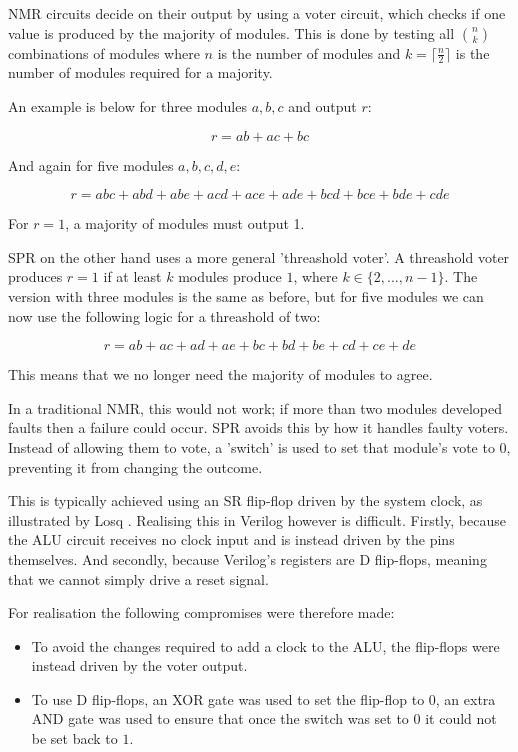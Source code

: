 \documentclass[a4paper,12pt]{article}
\begin{document}
    NMR circuits decide on their output by using a voter circuit, which checks if one value is produced by the majority of modules. This is done by testing all ${n \choose k}$ combinations of modules where $n$ is the number of modules and $k = \lceil\frac{n}{2}\rceil$ is the number of modules required for a majority.

    An example is below for three modules $a, b, c$ and output $r$:

    $$r = ab + ac + bc$$

    And again for five modules $a, b, c, d, e$:

    $$r = abc + abd + abe + acd + ace + ade + bcd + bce + bde + cde$$

    For $r = 1$, a majority of modules must output 1.

    SPR on the other hand uses a more general 'threashold voter'. A threashold voter produces $r = 1$ if at least $k$ modules produce $1$, where $k \in \{2,...,n-1\}$. The version with three modules is the same as before, but for five modules we can now use the following logic for a threashold of two:

    $$r = ab + ac + ad + ae + bc + bd + be + cd + ce + de$$

    This means that we no longer need the majority of modules to agree.

    In a traditional NMR, this would not work; if more than two modules developed faults then a failure could occur. SPR avoids this by how it handles faulty voters. Instead of allowing them to vote, a 'switch' is used to set that module's vote to $0$, preventing it from changing the outcome.

    This is typically achieved using an SR flip-flop driven by the system clock, as illustrated by Losq \cite[Section 2-B]{1674656}. Realising this in Verilog however is difficult. Firstly, because the ALU circuit receives no clock input and is instead driven by the pins themselves. And secondly, because Verilog's registers are D flip-flops, meaning that we cannot simply drive a reset signal.

    For realisation the following compromises were therefore made:

    \begin{itemize}
        \item To avoid the changes required to add a clock to the ALU, the flip-flops were instead driven by the voter output.
        \item To use D flip-flops, an XOR gate was used to set the flip-flop to $0$, an extra AND gate was used to ensure that once the switch was set to $0$ it could not be set back to $1$.
    \end{itemize}
\end{document}
